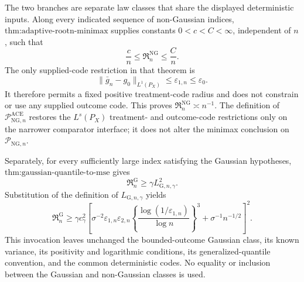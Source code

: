 The two branches are separate law classes that share the displayed deterministic inputs.  Along every indicated sequence of non-Gaussian indices, \(\text{thm:adaptive-rootn-minimax}\) supplies constants \(0<c<C<\infty\), independent of \(n\), such that
\[
 \frac cn\le\mathfrak R_n^{\mathrm{NG}}\le\frac Cn.
\]
The only supplied-code restriction in that theorem is
\[
 \|\bar g_n-g_0\|_{L^1(P_X)}\le\varepsilon_{1,n}\le\varepsilon_0.
\]
It therefore permits a fixed positive treatment-code radius and does not constrain or use any supplied outcome code.  This proves \(\mathfrak R_n^{\mathrm{NG}}\asymp n^{-1}\).  The definition of \(\mathcal P_{\mathrm{NG},n}^{\mathrm{ACE}}\) restores the \(L^s(P_X)\) treatment- and outcome-code restrictions only on the narrower comparator interface; it does not alter the minimax conclusion on \(\mathcal P_{\mathrm{NG},n}\).

Separately, for every sufficiently large index satisfying the Gaussian hypotheses, \(\text{thm:gaussian-quantile-to-mse}\) gives
\[
 \mathfrak R_n^{\mathrm G}\ge\gamma L_{\mathrm G,n,\gamma}^2.
\]
Substitution of the definition of \(L_{\mathrm G,n,\gamma}\) yields
\[
 \mathfrak R_n^{\mathrm G}
 \ge\gamma c_{\gamma}^2
 \left[
  \sigma^{-2}\varepsilon_{1,n}\varepsilon_{2,n}
  \left\{\frac{\log(1/\varepsilon_{1,n})}{\log n}\right\}^3
  +\sigma^{-1}n^{-1/2}
 \right]^2.
\]
This invocation leaves unchanged the bounded-outcome Gaussian class, its known variance, its positivity and logarithmic conditions, its generalized-quantile convention, and the common deterministic codes.  No equality or inclusion between the Gaussian and non-Gaussian classes is used.